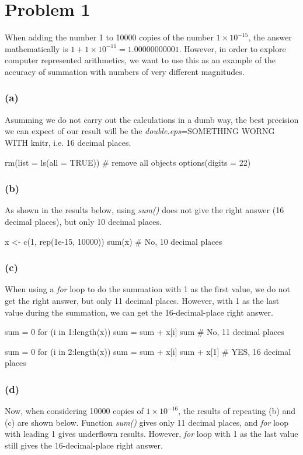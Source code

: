 \documentclass{article}
\newcommand{\rinline}[1]{SOMETHING WORNG WITH knitr}
\begin{document}
\section*{Problem 1}

When adding the number 1 to 10000 copies of the number $1 \times 10^{-15}$, the answer mathematically is 
$1 + 1 \times 10^{-11} = 1.00000000001$. However, in order to explore computer represented arithmetics, 
we want to use this as an example of the accuracy of summation with numbers of very different magnitudes.

\subsubsection*{(a)}
Asumming we do not carry out the calculations in a dumb way, the best precision we can expect of our result
will be the \textit{double.eps}=\rinline{.Machine$double.eps}, i.e. 16 decimal places.

rm(list = ls(all = TRUE)) # remove all objects
options(digits = 22)

\subsubsection*{(b)}
As shown in the results below, using \textit{sum()} does not give the right answer (16 decimal places), but only
10 decimal places.

x <- c(1, rep(1e-15, 10000))
sum(x) # No, 10 decimal places

\subsubsection*{(c)}
When using a \textit{for} loop to do the summation with 1 as the first value, we do not get the right answer,
but only 11 decimal places. However, with 1 as the last value during the summation, we can get the 16-decimal-place
right answer.

sum = 0
for (i in 1:length(x))  sum = sum + x[i]
sum # No, 11 decimal places

sum = 0
for (i in 2:length(x))  sum = sum + x[i]
sum + x[1] # YES, 16 decimal places

\subsubsection*{(d)}
Now, when considering 10000 copies of $1 \times 10^{-16}$, the results of repeating (b) and (c) are shown below.
Function \textit{sum()} gives only 11 decimal places, and \textit{for} loop with leading 1 gives underflown results.
However, \textit{for} loop with 1 as the last value still gives the 16-decimal-place right answer.
\end{document}
